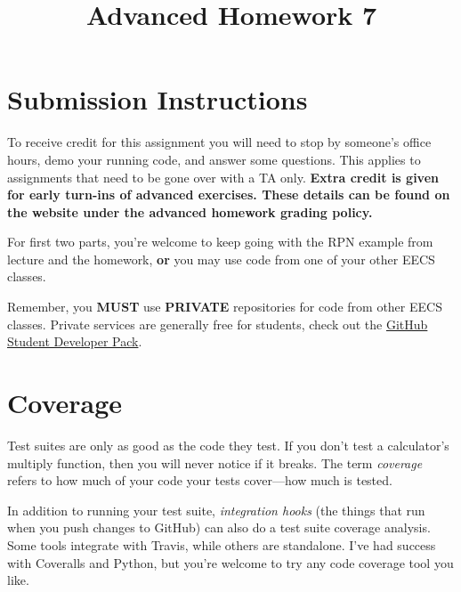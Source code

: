 \documentclass{article}
\begin{document}
\fancyfoot[C]{\color{gray} \thepage~/~\pageref*{LastPage}}
\pagestyle{fancyplain}

\title{\textbf{Advanced Homework 7\\}}
\author{\textbf{\color{red}{Due: Wednesday, March 7th, 11:59PM (Hard Deadline)}}}
\date{}
\maketitle


\section*{Submission Instructions}
To receive credit for this assignment you will need to stop by someone's
office hours, demo your running code, and answer some questions. \textbf{\color{red}{Make sure
to check the office hour schedule as the real due date is at the last office
hours before the date listed above.}} This applies to assignments that need to be gone over with a TA only.
\textbf{Extra credit is given for early turn-ins of advanced exercises. These details can be found on the website under the advanced homework grading policy.}


\begin{mdframed}[innerleftmargin=38pt,innerrightmargin=38pt]\justify
  For first two parts, you're welcome to keep going with the RPN example from
  lecture and the homework, \textbf{or} you may use code from one of your
  other EECS classes.

  {\color{red}Remember, you \textbf{MUST} use \textbf{PRIVATE} repositories
    for code from other EECS classes.} Private services are generally free for
  students, check out the \href{https://education.github.com/pack}{GitHub Student Developer Pack}.
\end{mdframed}

\section{Coverage}

Test suites are only as good as the code they test. If you don't test a
calculator's multiply function, then you will never notice if it breaks. The
term \emph{coverage} refers to how much of your code your tests cover---how
much is tested.

In addition to running your test suite, \emph{integration hooks} (the things
that run when you push changes to GitHub) can also do a test suite coverage
analysis. Some tools integrate with Travis, while others are standalone. I've
had success with Coveralls and Python, but you're welcome to try any code
coverage tool you like.
\end{document}
